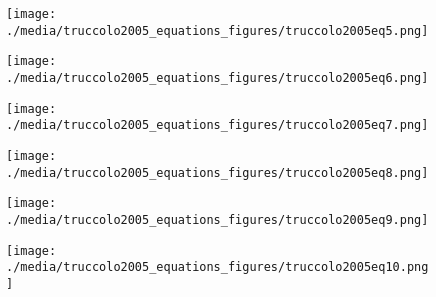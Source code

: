 \documentclass[svgnames,13pt]{beamer}
\begin{document}
\begin{frame}{}
\begin{figure}\centering\texttt{[image: ./media/truccolo2005\_equations\_figures/truccolo2005eq5.png]}\\\end{figure}
\end{frame} 

\begin{frame}{}
\begin{figure}\centering\texttt{[image: ./media/truccolo2005\_equations\_figures/truccolo2005eq6.png]}\\\end{figure}
\end{frame} 

\begin{frame}{}
\begin{figure}\centering\texttt{[image: ./media/truccolo2005\_equations\_figures/truccolo2005eq7.png]}\\\end{figure}
\end{frame} 

\begin{frame}{}
\begin{figure}\centering\texttt{[image: ./media/truccolo2005\_equations\_figures/truccolo2005eq8.png]}\\\end{figure}
\end{frame} 

\begin{frame}{}
\begin{figure}\centering\texttt{[image: ./media/truccolo2005\_equations\_figures/truccolo2005eq9.png]}\\\end{figure}
\end{frame} 

\begin{frame}{}
\begin{figure}\centering\texttt{[image: ./media/truccolo2005\_equations\_figures/truccolo2005eq10.png]}\\\end{figure}
\end{frame} 
\end{document}
